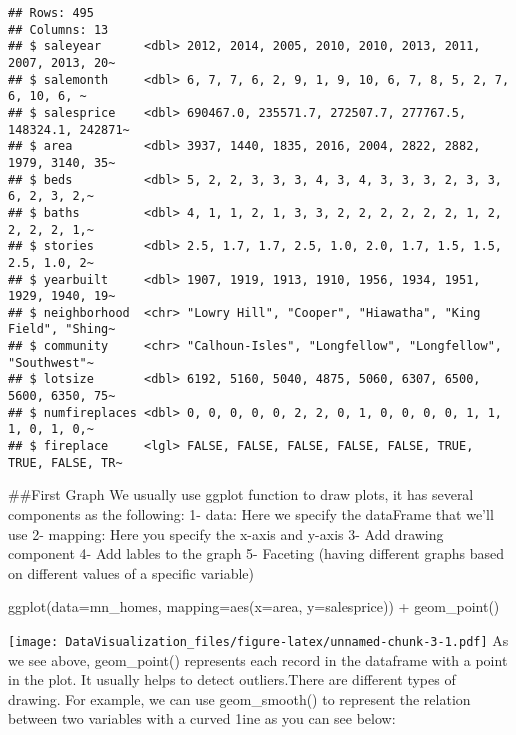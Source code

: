 \documentclass[
]{article}
\newenvironment{Shaded}{\begin{snugshade}}{\end{snugshade}}
\newcommand{\AttributeTok}[1]{\textcolor[rgb]{0.77,0.63,0.00}{#1}}
\newcommand{\FunctionTok}[1]{\textcolor[rgb]{0.00,0.00,0.00}{#1}}
\newcommand{\NormalTok}[1]{#1}
\newcommand{\SpecialCharTok}[1]{\textcolor[rgb]{0.00,0.00,0.00}{#1}}
\begin{document}
\begin{verbatim}
## Rows: 495
## Columns: 13
## $ saleyear      <dbl> 2012, 2014, 2005, 2010, 2010, 2013, 2011, 2007, 2013, 20~
## $ salemonth     <dbl> 6, 7, 7, 6, 2, 9, 1, 9, 10, 6, 7, 8, 5, 2, 7, 6, 10, 6, ~
## $ salesprice    <dbl> 690467.0, 235571.7, 272507.7, 277767.5, 148324.1, 242871~
## $ area          <dbl> 3937, 1440, 1835, 2016, 2004, 2822, 2882, 1979, 3140, 35~
## $ beds          <dbl> 5, 2, 2, 3, 3, 3, 4, 3, 4, 3, 3, 3, 2, 3, 3, 6, 2, 3, 2,~
## $ baths         <dbl> 4, 1, 1, 2, 1, 3, 3, 2, 2, 2, 2, 2, 2, 1, 2, 2, 2, 2, 1,~
## $ stories       <dbl> 2.5, 1.7, 1.7, 2.5, 1.0, 2.0, 1.7, 1.5, 1.5, 2.5, 1.0, 2~
## $ yearbuilt     <dbl> 1907, 1919, 1913, 1910, 1956, 1934, 1951, 1929, 1940, 19~
## $ neighborhood  <chr> "Lowry Hill", "Cooper", "Hiawatha", "King Field", "Shing~
## $ community     <chr> "Calhoun-Isles", "Longfellow", "Longfellow", "Southwest"~
## $ lotsize       <dbl> 6192, 5160, 5040, 4875, 5060, 6307, 6500, 5600, 6350, 75~
## $ numfireplaces <dbl> 0, 0, 0, 0, 0, 2, 2, 0, 1, 0, 0, 0, 0, 1, 1, 1, 0, 1, 0,~
## $ fireplace     <lgl> FALSE, FALSE, FALSE, FALSE, FALSE, TRUE, TRUE, FALSE, TR~
\end{verbatim}

\#\#First Graph We usually use ggplot function to draw plots, it has
several components as the following: 1- data: Here we specify the
dataFrame that we'll use 2- mapping: Here you specify the x-axis and
y-axis 3- Add drawing component 4- Add lables to the graph 5- Faceting
(having different graphs based on different values of a specific
variable)

\begin{Shaded}
\begin{Highlighting}[]
\FunctionTok{ggplot}\NormalTok{(}\AttributeTok{data=}\NormalTok{mn\_homes, }\AttributeTok{mapping=}\FunctionTok{aes}\NormalTok{(}\AttributeTok{x=}\NormalTok{area, }\AttributeTok{y=}\NormalTok{salesprice)) }\SpecialCharTok{+} \FunctionTok{geom\_point}\NormalTok{()}
\end{Highlighting}
\end{Shaded}

\texttt{[image: DataVisualization\_files/figure-latex/unnamed-chunk-3-1.pdf]}
As we see above, geom\_point() represents each record in the dataframe
with a point in the plot. It usually helps to detect outliers.There are
different types of drawing. For example, we can use geom\_smooth() to
represent the relation between two variables with a curved 1ine as you
can see below:
\end{document}
